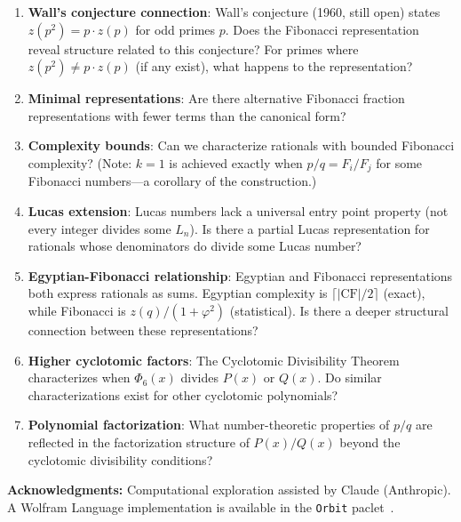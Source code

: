 \documentclass[11pt]{article}
\begin{document}
\begin{enumerate}
    \item \textbf{Wall's conjecture connection}: Wall's conjecture (1960, still open) states $z(p^2) = p \cdot z(p)$ for odd primes $p$. Does the Fibonacci representation reveal structure related to this conjecture? For primes where $z(p^2) \neq p \cdot z(p)$ (if any exist), what happens to the representation?

    \item \textbf{Minimal representations}: Are there alternative Fibonacci fraction representations with fewer terms than the canonical form?

    \item \textbf{Complexity bounds}: Can we characterize rationals with bounded Fibonacci complexity? (Note: $k = 1$ is achieved exactly when $p/q = F_i/F_j$ for some Fibonacci numbers---a corollary of the construction.)

    \item \textbf{Lucas extension}: Lucas numbers lack a universal entry point property (not every integer divides some $L_n$). Is there a partial Lucas representation for rationals whose denominators do divide some Lucas number?

    \item \textbf{Egyptian-Fibonacci relationship}: Egyptian and Fibonacci representations both express rationals as sums. Egyptian complexity is $\lceil |\mathrm{CF}|/2 \rceil$ (exact), while Fibonacci is $z(q)/(1+\varphi^2)$ (statistical). Is there a deeper structural connection between these representations?

    \item \textbf{Higher cyclotomic factors}: The Cyclotomic Divisibility Theorem characterizes when $\Phi_6(x)$ divides $P(x)$ or $Q(x)$. Do similar characterizations exist for other cyclotomic polynomials?

    \item \textbf{Polynomial factorization}: What number-theoretic properties of $p/q$ are reflected in the factorization structure of $P(x)/Q(x)$ beyond the cyclotomic divisibility conditions?
\end{enumerate}

\vspace{1em}
\noindent\textbf{Acknowledgments:} Computational exploration assisted by Claude (Anthropic). A Wolfram Language implementation is available in the \texttt{Orbit} paclet~\cite{egypt2025}.



\end{document}
